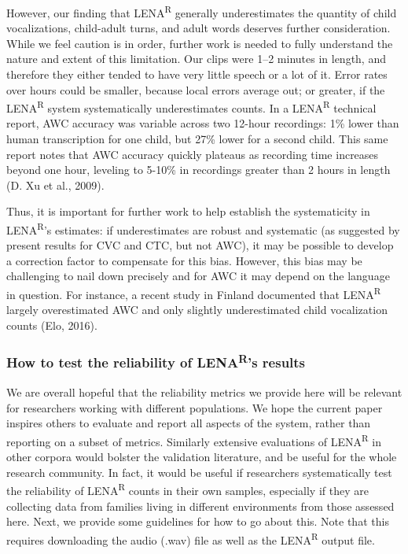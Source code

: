 \documentclass[english,table,man,floatsintext]{apa6}
\begin{document}
However, our finding that LENA\textsuperscript{R} generally underestimates the quantity of child vocalizations, child-adult turns, and adult words deserves further consideration. While we feel caution is in order, further work is needed to fully understand the nature and extent of this limitation. Our clips were 1--2 minutes in length, and therefore they either tended to have very little speech or a lot of it. Error rates over hours could be smaller, because local errors average out; or greater, if the LENA\textsuperscript{R} system systematically underestimates counts. In a LENA\textsuperscript{R} technical report, AWC accuracy was variable across two 12-hour recordings: 1\% lower than human transcription for one child, but 27\% lower for a second child. This same report notes that AWC accuracy quickly plateaus as recording time increases beyond one hour, leveling to 5-10\% in recordings greater than 2 hours in length (D. Xu et al., 2009).

Thus, it is important for further work to help establish the systematicity in LENA\textsuperscript{R}'s estimates: if underestimates are robust and systematic (as suggested by present results for CVC and CTC, but not AWC), it may be possible to develop a correction factor to compensate for this bias. However, this bias may be challenging to nail down precisely and for AWC it may depend on the language in question. For instance, a recent study in Finland documented that LENA\textsuperscript{R} largely overestimated AWC and only slightly underestimated child vocalization counts (Elo, 2016).

\hypertarget{how-to-test-the-reliability-of-lenars-results}{%
\subsubsection{\texorpdfstring{How to test the reliability of LENA\textsuperscript{R}'s results}{How to test the reliability of LENAR's results}}\label{how-to-test-the-reliability-of-lenars-results}}

We are overall hopeful that the reliability metrics we provide here will be relevant for researchers working with different populations. We hope the current paper inspires others to evaluate and report all aspects of the system, rather than reporting on a subset of metrics. Similarly extensive evaluations of LENA\textsuperscript{R} in other corpora would bolster the validation literature, and be useful for the whole research community. In fact, it would be useful if researchers systematically test the reliability of LENA\textsuperscript{R} counts in their own samples, especially if they are collecting data from families living in different environments from those assessed here. Next, we provide some guidelines for how to go about this. Note that this requires downloading the audio (.wav) file as well as the LENA\textsuperscript{R} output file.
\end{document}
